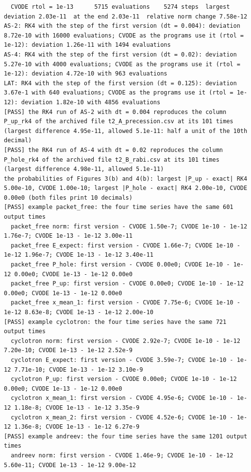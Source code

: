 \documentclass[
  10pt,
]{article}
\begin{document}
\begin{verbatim}
  CVODE rtol = 1e-13      5715 evaluations    5274 steps  largest deviation 2.03e-11  at the end 2.03e-11  relative norm change 7.58e-12
AS-2: RK4 with the step of the first version (dt = 0.004): deviation 8.72e-10 with 16000 evaluations; CVODE as the programs use it (rtol = 1e-12): deviation 1.26e-11 with 1494 evaluations
AS-4: RK4 with the step of the first version (dt = 0.02): deviation 5.27e-10 with 4000 evaluations; CVODE as the programs use it (rtol = 1e-12): deviation 4.72e-10 with 963 evaluations
LAT: RK4 with the step of the first version (dt = 0.125): deviation 3.67e-1 with 640 evaluations; CVODE as the programs use it (rtol = 1e-12): deviation 1.82e-10 with 4856 evaluations
[PASS] the RK4 run of AS-2 with dt = 0.004 reproduces the column P_up_rk4 of the archived file t2_A_precession.csv at its 101 times (largest difference 4.95e-11, allowed 5.1e-11: half a unit of the 10th decimal)
[PASS] the RK4 run of AS-4 with dt = 0.02 reproduces the column P_hole_rk4 of the archived file t2_B_rabi.csv at its 101 times (largest difference 4.98e-11, allowed 5.1e-11)
the probabilities of Figures 3(b) and 4(b): largest |P_up - exact| RK4 5.00e-10, CVODE 1.00e-10; largest |P_hole - exact| RK4 2.00e-10, CVODE 0.00e0 (both files print 10 decimals)
[PASS] example packet_free: the four time series have the same 601 output times
  packet_free norm: first version - CVODE 1.50e-7; CVODE 1e-10 - 1e-12 1.76e-7; CVODE 1e-13 - 1e-12 3.00e-11
  packet_free E_expect: first version - CVODE 1.66e-7; CVODE 1e-10 - 1e-12 1.96e-7; CVODE 1e-13 - 1e-12 3.40e-11
  packet_free P_hole: first version - CVODE 0.00e0; CVODE 1e-10 - 1e-12 0.00e0; CVODE 1e-13 - 1e-12 0.00e0
  packet_free P_up: first version - CVODE 0.00e0; CVODE 1e-10 - 1e-12 0.00e0; CVODE 1e-13 - 1e-12 0.00e0
  packet_free x_mean_1: first version - CVODE 7.75e-6; CVODE 1e-10 - 1e-12 8.63e-8; CVODE 1e-13 - 1e-12 2.00e-10
[PASS] example cyclotron: the four time series have the same 721 output times
  cyclotron norm: first version - CVODE 2.92e-7; CVODE 1e-10 - 1e-12 7.20e-10; CVODE 1e-13 - 1e-12 2.52e-9
  cyclotron E_expect: first version - CVODE 3.59e-7; CVODE 1e-10 - 1e-12 7.71e-10; CVODE 1e-13 - 1e-12 3.10e-9
  cyclotron P_up: first version - CVODE 0.00e0; CVODE 1e-10 - 1e-12 0.00e0; CVODE 1e-13 - 1e-12 0.00e0
  cyclotron x_mean_1: first version - CVODE 4.95e-6; CVODE 1e-10 - 1e-12 1.18e-8; CVODE 1e-13 - 1e-12 3.35e-9
  cyclotron x_mean_2: first version - CVODE 4.52e-6; CVODE 1e-10 - 1e-12 1.36e-8; CVODE 1e-13 - 1e-12 6.27e-9
[PASS] example andreev: the four time series have the same 1201 output times
  andreev norm: first version - CVODE 1.46e-9; CVODE 1e-10 - 1e-12 5.60e-11; CVODE 1e-13 - 1e-12 9.00e-12

\end{verbatim}
\end{document}
